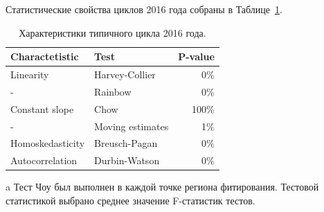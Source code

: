 \documentclass{article}
\begin{document}
	Статистические свойства циклов 2016 года собраны в Таблице~\ref{tbl:CycleChars}.
	
	\begin{center}
		\begin{table}
			\centering
			\begin{threeparttable}
				\caption{Характеристики типичного цикла 2016 года.\label{tbl:CycleChars}}
				\begin{tabular}{llr}
					\hline\hline
					Charactetistic	& Test 					& P-value\\
					\hline
					Linearity 		& Harvey-Collier		& 0\% \\
					-				& Rainbow				& 0\% \\
					Constant slope	& Chow\tnote{a}		 	& 100\% \\
					-				& Moving estimates		& 1\% \\
					Homoskedasticity& Breusch-Pagan 		& 0\% \\
					Autocorrelation & Durbin-Watson			& 0\% \\
					\hline\hline
				\end{tabular}
				\begin{tablenotes}
					\item[a]{Тест Чоу был выполнен в каждой точке региона фитирования. Тестовой статистикой выбрано среднее значение F-статистик тестов.}
				\end{tablenotes}
			\end{threeparttable}
		\end{table}
	\end{center}
\end{document}
